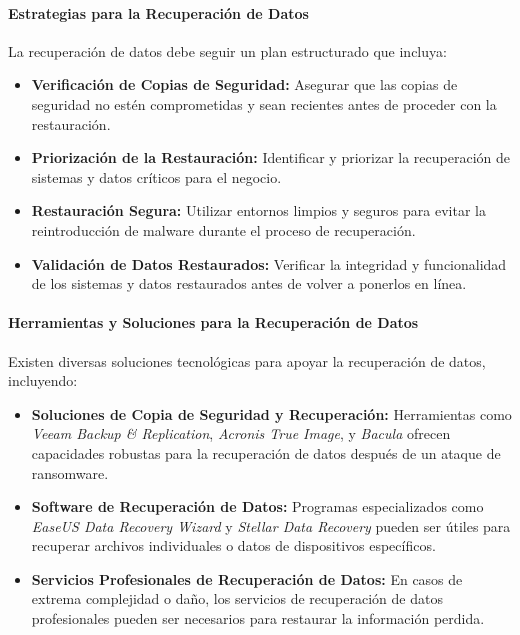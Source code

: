\paragraph{Estrategias para la Recuperación de Datos}

La recuperación de datos debe seguir un plan estructurado que incluya:

\begin{itemize}
    \item \textbf{Verificación de Copias de Seguridad:} Asegurar que las copias de seguridad no estén comprometidas y sean recientes antes de proceder con la restauración.
    \item \textbf{Priorización de la Restauración:} Identificar y priorizar la recuperación de sistemas y datos críticos para el negocio.
    \item \textbf{Restauración Segura:} Utilizar entornos limpios y seguros para evitar la reintroducción de malware durante el proceso de recuperación.
    \item \textbf{Validación de Datos Restaurados:} Verificar la integridad y funcionalidad de los sistemas y datos restaurados antes de volver a ponerlos en línea.
\end{itemize}

\paragraph{Herramientas y Soluciones para la Recuperación de Datos}

Existen diversas soluciones tecnológicas para apoyar la recuperación de datos, incluyendo:

\begin{itemize}
    \item \textbf{Soluciones de Copia de Seguridad y Recuperación:} Herramientas como \textit{Veeam Backup \& Replication}, \textit{Acronis True Image}, y \textit{Bacula} ofrecen capacidades robustas para la recuperación de datos después de un ataque de ransomware.
    \item \textbf{Software de Recuperación de Datos:} Programas especializados como \textit{EaseUS Data Recovery Wizard} y \textit{Stellar Data Recovery} pueden ser útiles para recuperar archivos individuales o datos de dispositivos específicos.
    \item \textbf{Servicios Profesionales de Recuperación de Datos:} En casos de extrema complejidad o daño, los servicios de recuperación de datos profesionales pueden ser necesarios para restaurar la información perdida.
\end{itemize}

